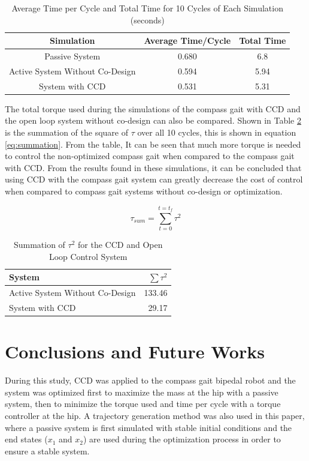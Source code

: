 \documentclass[smallextended]{./springer/svjour3}
\begin{document}
\begin{table}[h]
\centering
\caption{Average Time per Cycle and Total Time for 10 Cycles of Each Simulation (seconds)}
\begin{tabular}{ccc}
\toprule
Simulation & Average Time/Cycle & Total Time \\
\midrule
Passive System & 0.680 & 6.8 \\
Active System Without Co-Design & 0.594 & 5.94 \\
System with CCD & 0.531 & 5.31\\
\end{tabular}
\label{tab:time}
\end{table}

The total torque used during the simulations of the compass gait with CCD and the open loop system without co-design can also be compared. Shown in Table \ref{tab:tautot} is 
the summation of the square of $\tau$ over all 10 cycles, this is shown in equation \ref{eq:summation}. From the table, It can be seen that much more torque is needed to control 
the non-optimized 
compass gait when compared to the compass gait with CCD. From the results found in these simulations, it can be concluded that using CCD with the compass gait 
system can greatly decrease the cost of control when compared to compass gait systems without co-design or optimization.

\begin{equation}
\label{eq:summation}
\tau_{sum} = 
\sum_{t = 0}^{t = t_f}
\tau^2
\end{equation}

\begin{table}[h]
\centering
\caption{Summation of $\tau^2$ for the CCD and Open Loop Control System}
\begin{tabular}{lr}
\toprule
System & $\sum \tau^2$ \\
\midrule
Active System Without Co-Design & 133.46\\
System with CCD & 29.17\\
\end{tabular}
\label{tab:tautot}
\end{table}


\section{Conclusions and Future Works}

During this study, CCD was applied to the compass gait bipedal robot and the system was optimized first to maximize the mass at the hip with a passive system, 
then to minimize the torque used and time per cycle with a torque controller at the hip. A trajectory generation method was also used in this paper, 
where a passive system is first simulated with stable initial conditions and the end states ($x_1$ and $x_2$) are used during the optimization process in order to 
ensure a stable system.
\end{document}
